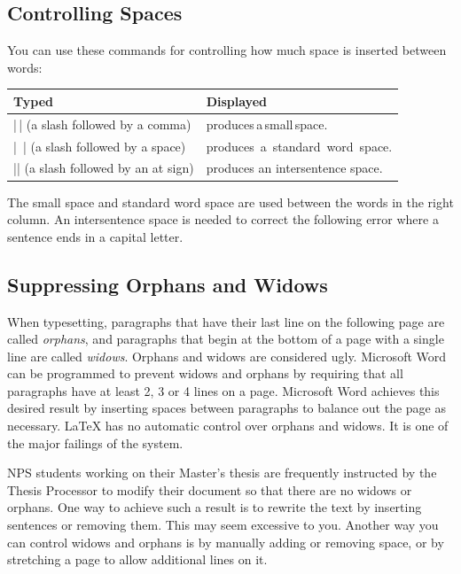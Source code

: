 \subsection{Controlling Spaces}

You can use these commands for controlling how much space is inserted
between words:

\begin{center}
\begin{tabular}{l|l}
Typed                                 & Displayed\\\hline
|\,| (a slash followed by a comma)    & produces\,a\,small\,space. \\
|\ | (a slash followed by a space)    & produces\ a\ standard\ word\ space. \\
|\@| (a slash followed by an at sign) & produces an intersentence space. \\
\end{tabular}
\end{center}


The small space and standard word space are used between the words in the right column.  An intersentence space is needed to correct the following error where a sentence ends in a capital letter.

\subsection{Suppressing Orphans and Widows}

When typesetting, paragraphs that have their last line on the following page
are called \emph{orphans}, and paragraphs that begin at the bottom of a page
with a single line are called \emph{widows}. Orphans and widows are considered
ugly. Microsoft Word can be programmed to prevent widows and orphans by
requiring that all paragraphs have at least 2, 3 or 4 lines on a page.
Microsoft Word achieves this desired result by inserting spaces between
paragraphs to balance out the page as necessary. \LaTeX{} has no automatic
control over orphans and widows. It is one of the major failings of the system.

NPS students working on their Master's thesis are frequently instructed by the
Thesis Processor to modify their document so that there are no widows or
orphans. One way to achieve such a result is to rewrite the text by inserting
sentences or removing them. This may seem excessive to you. Another way you can
control widows and orphans is by manually adding or removing space, or by
stretching a page to allow additional lines on it.

